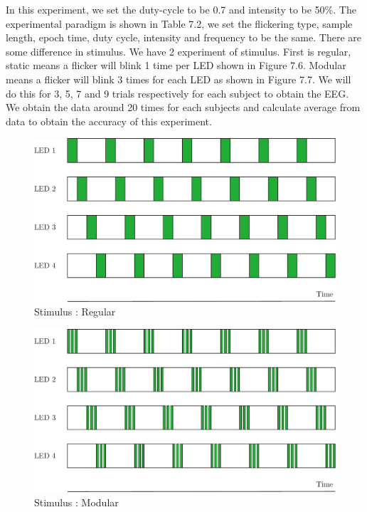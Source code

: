 In this experiment, we set the duty-cycle to be 0.7 and intensity to be 50\%. The experimental paradigm is shown in Table 7.2, we set the flickering type, sample length, epoch time, duty cycle, intensity and frequency to be the same. There are some difference in stimulus. We have 2 experiment of stimulus. First is regular, static means a flicker will blink 1 time per LED shown in Figure 7.6. Modular means a flicker will blink 3 times for each LED as shown in Figure 7.7. We will do this for 3, 5, 7 and 9 trials respectively for each subject to obtain the EEG. We obtain the data around 20 times for each subjects and calculate average from data to obtain the accuracy of this experiment.

\begin{figure}[ht]
	\centering
	\includegraphics[scale = 0.65]{chapter7/sta_nor.pdf}
	\caption{Stimulus : Regular}
\end{figure}

\begin{figure}[ht]
	\centering
	\includegraphics[scale = 0.65]{chapter7/mod_nor.pdf}
	\caption{Stimulus : Modular}
\end{figure}

